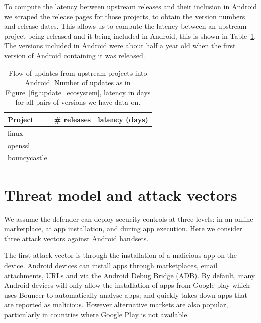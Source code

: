 \documentclass{sig-alternate}
\let\OldTodo\todo
\renewcommand{\todo}{\OldTodo[inline]}
\newcommand{\todolater}[1]{}%
\begin{document}
To compute the latency between upstream releases and their inclusion in Android we scraped the release pages for those projects, to obtain the version numbers and release dates.
This allows us to compute the latency between an upstream project being released and it being included in Android, this is shown in Table~\ref{tab:update_ecosystem}.
The versions included in Android were about half a year old when the first version of Android containing it was released.
\begin{table}
\centering
\normalsize
\begin{tabular}{l|r|r}
Project	&	\# releases	&	latency (days) \\ \hline
linux	&	\linuxNumVersions	&	\linuxMeanUpdateLatency \\
openssl	&	\opensslNumVersions	&	\opensslMeanUpdateLatency \\
bouncycastle	&	\bouncycastleNumVersions	&	\bouncycastleMeanUpdateLatency \\
\end{tabular}
\caption{Flow of updates from upstream projects into Android. Number of updates as in Figure~\ref{fig:update_ecosystem}, latency in days for all pairs of versions we have data on.\todolater{scrape the other 26 websites... is it worth it?}}
\label{tab:update_ecosystem}
\end{table}

\section{Threat model and attack vectors}
\label{sec:threatmodel}

We assume the defender can deploy security controls at three levels: in an online marketplace, at app installation, and during app execution.
Here we consider three attack vectors against Android handsets.

The first attack vector is through the installation of a malicious app on the device.
Android devices can install apps through marketplaces, email attachments, URLs and via the Android Debug Bridge (ADB).
By default, many Android devices will only allow the installation of apps from Google play which uses Bouncer to automatically analyse apps; and quickly takes down apps that are reported as malicious.
However alternative markets are also popular, particularly in countries where Google Play is not available.
\end{document}
